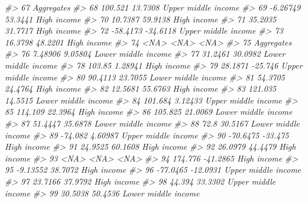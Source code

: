 \documentclass[
  xelatex, ja=standard]{bxjsbook}
\newenvironment{Shaded}{\begin{snugshade}}{\end{snugshade}}
\newcommand{\CommentTok}[1]{\textcolor[rgb]{0.56,0.35,0.01}{\textit{#1}}}
\theoremstyle{definition}
\theoremstyle{definition}
\theoremstyle{definition}
\theoremstyle{definition}
\theoremstyle{remark}
\begin{document}
\begin{Shaded}
\begin{Highlighting}[]
\CommentTok{\#\textgreater{} 67                                 Aggregates}
\CommentTok{\#\textgreater{} 68     100.521    13.7308 Upper middle income}
\CommentTok{\#\textgreater{} 69    {-}6.26749    53.3441         High income}
\CommentTok{\#\textgreater{} 70     10.7387    59.9138         High income}
\CommentTok{\#\textgreater{} 71     35.2035    31.7717         High income}
\CommentTok{\#\textgreater{} 72    {-}58.4173   {-}34.6118 Upper middle income}
\CommentTok{\#\textgreater{} 73     16.3798    48.2201         High income}
\CommentTok{\#\textgreater{} 74        \textless{}NA\textgreater{}       \textless{}NA\textgreater{}                \textless{}NA\textgreater{}}
\CommentTok{\#\textgreater{} 75                                 Aggregates}
\CommentTok{\#\textgreater{} 76     7.48906    9.05804 Lower middle income}
\CommentTok{\#\textgreater{} 77     31.2461    30.0982 Lower middle income}
\CommentTok{\#\textgreater{} 78      103.85    1.28941         High income}
\CommentTok{\#\textgreater{} 79     28.1871    {-}25.746 Upper middle income}
\CommentTok{\#\textgreater{} 80     90.4113    23.7055 Lower middle income}
\CommentTok{\#\textgreater{} 81     54.3705    24.4764         High income}
\CommentTok{\#\textgreater{} 82     12.5681    55.6763         High income}
\CommentTok{\#\textgreater{} 83     121.035    14.5515 Lower middle income}
\CommentTok{\#\textgreater{} 84     101.684    3.12433 Upper middle income}
\CommentTok{\#\textgreater{} 85     114.109    22.3964         High income}
\CommentTok{\#\textgreater{} 86     105.825    21.0069 Lower middle income}
\CommentTok{\#\textgreater{} 87     51.4447    35.6878 Lower middle income}
\CommentTok{\#\textgreater{} 88        72.8    30.5167 Lower middle income}
\CommentTok{\#\textgreater{} 89     {-}74.082    4.60987 Upper middle income}
\CommentTok{\#\textgreater{} 90    {-}70.6475    {-}33.475         High income}
\CommentTok{\#\textgreater{} 91     24.9525    60.1608         High income}
\CommentTok{\#\textgreater{} 92     26.0979    44.4479         High income}
\CommentTok{\#\textgreater{} 93        \textless{}NA\textgreater{}       \textless{}NA\textgreater{}                \textless{}NA\textgreater{}}
\CommentTok{\#\textgreater{} 94     174.776   {-}41.2865         High income}
\CommentTok{\#\textgreater{} 95    {-}9.13552    38.7072         High income}
\CommentTok{\#\textgreater{} 96    {-}77.0465   {-}12.0931 Upper middle income}
\CommentTok{\#\textgreater{} 97     23.7166    37.9792         High income}
\CommentTok{\#\textgreater{} 98      44.394    33.3302 Upper middle income}
\CommentTok{\#\textgreater{} 99     30.5038    50.4536 Lower middle income}

\end{Highlighting}
\end{Shaded}
\end{document}
